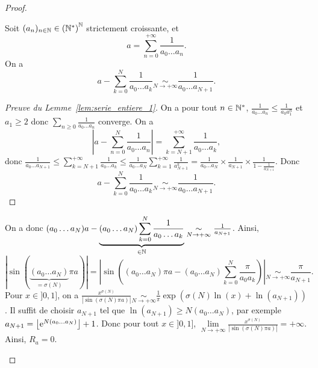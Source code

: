 \documentclass[12pt]{article}
\begin{document}
\begin{proof}
\begin{enumerate}
        \begin{lemma}
            \label{lem:serie_entiere_1}
            Soit $(a_n)_{n\in\mathbb{N}}\in\left(\mathbb{N}^{*}\right)^{\mathbb{N}}$ strictement croissante, et 
            \begin{equation}
                a=\sum_{n=0}^{+\infty}\frac{1}{a_0\dots a_n}.
            \end{equation}
            On a 
            \begin{equation}
                a-\sum_{k=0}^{N}\frac{1}{a_0\dots a_k}\underset{N\to+\infty}{\sim}\frac{1}{a_0\dots a_{N+1}}.
            \end{equation}
        \end{lemma}
        \begin{proof}[Preuve du Lemme~\ref{lem:serie_entiere_1}]
            On a pour tout $n\in\mathbb{N}^{*}$, $\frac{1}{a_{0}\dots a_{n}}\leqslant\frac{1}{a_{0}a_{1}^{n}}$ et $a_{1}\geqslant2$ donc $\sum_{n\geqslant0}\frac{1}{a_{0}\dots a_{n}}$ converge. On a
            \begin{equation}
                \left\lvert a-\sum_{n=0}^{N}\frac{1}{a_{0}\dots a_{n}}\right\rvert=\sum_{k=N+1}^{+\infty}\frac{1}{a_0\dots a_k},
            \end{equation}
            donc 
            $\frac{1}{a_0\dots a_{N+1}}\leqslant \sum_{k=N+1}^{+\infty}\frac{1}{a_0\dots a_k}\leqslant\frac{1}{a_0\dots a_N}\sum_{k=1}^{+\infty}\frac{1}{a_{N+1}^{k}}=\frac{1}{a_0\dots a_N}\times\frac{1}{a_{N+1}}\times\frac{1}{1-\frac{1}{a_{N+1}}}$. Donc 
            \begin{equation}
                a-\sum_{k=0}^{N}\frac{1}{a_0\dots a_k}\underset{N\to+\infty}{\sim}\frac{1}{a_0\dots a_{N+1}}.
            \end{equation}
        \end{proof}

        On a donc $(a_{0}\dots a_{N})a-\underbrace{(a_0\dots a_{N})\sum_{k=0}^{N}\frac{1}{a_{0}\dots a_{k}}}_{\in\mathbb{N}}\underset{N\to+\infty}{\sim}\frac{1}{a_{N+1}}$. Ainsi,
        \begin{equation}
            \left\lvert\sin\left(\underbrace{(a_0\dots a_N)}_{=\sigma(N)}\pi a\right)\right\rvert=\left\lvert\sin\left((a_0\dots a_N)\pi a-(a_0\dots a_N)\sum_{k=0}^{N}\frac{\pi}{a_{0}a_{k}}\right)\right\rvert\underset{N\to+\infty}{\sim}\frac{\pi}{a_{N+1}}.
        \end{equation}
        Pour $x\in]0,1]$, on a $\frac{x^{\sigma(N)}}{\left\lvert\sin(\sigma(N)\pi a)\right\rvert}\underset{N\to+\infty}{\sim}\frac{1}{\pi}\exp\left(\sigma(N)\ln(x)+\ln(a_{N+1})\right)$. Il suffit de choisir $a_{N+1}$ tel que $\ln(a_{N+1})\geqslant N(a_{0}\dots a_{N})$, par exemple $a_{N+1}=\left\lfloor \mathrm{e}^{N(a_{0}\dots a_{N})}\right\rfloor+1$. Donc pour tout $x\in]0,1]$, $\lim\limits_{N\to+\infty}\frac{x^{\sigma(N)}}{\left\lvert\sin(\sigma(N)\pi a)\right\rvert}=+\infty$. Ainsi, $R_a=0$.
    \end{enumerate}
\end{proof}
\end{document}
